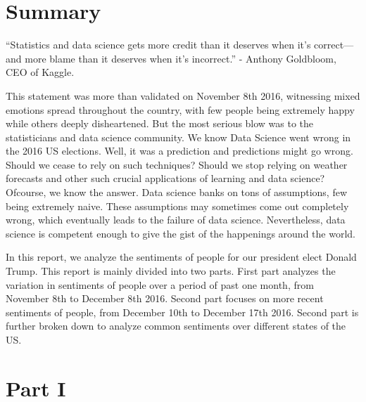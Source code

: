\documentclass[a4paper,12pt]{book}
\makeatletter
\def\cleardoublepage{\clearpage\if@twoside \ifodd\c@page\else%
  \hbox{}%
  \thispagestyle{empty}%
  \newpage%
  \if@twocolumn\hbox{}\newpage\fi\fi\fi}
\theoremstyle{break}
\makeatother
\begin{document}

\frontmatter

\chapter*{Summary}
“Statistics and data science gets more credit than it deserves when it’s correct—and more blame than it deserves when it’s incorrect.” - Anthony Goldbloom, CEO of Kaggle.

This statement was more than validated on November 8th 2016, witnessing mixed emotions spread throughout the country, with few people being extremely happy while others deeply disheartened. But the most serious blow was to the statisticians and data science community. We know Data Science went wrong in the 2016 US elections. Well, it was a prediction and predictions might go wrong. Should we cease to rely on such techniques? Should we stop relying on weather forecasts and other such crucial applications of learning and data science? Ofcourse, we know the answer. Data science banks on tons of assumptions, few being extremely naive. These assumptions may sometimes come out completely wrong, which eventually leads to the failure of data science. Nevertheless, data science is competent enough to give the gist of the happenings around the world.

In this report, we analyze the sentiments of people for our president elect Donald Trump. This report is mainly divided into two parts. First part analyzes the variation in sentiments of people over a period of past one month, from November 8th to December 8th 2016. Second part focuses on more recent sentiments of people, from December 10th to December 17th 2016. Second part is further broken down to analyze common sentiments over different states of the US.

\clearpage
\tableofcontents

\clearpage
\listoffigures

\clearpage


\mainmatter
\pagestyle{fancy}

\cleardoublepage





\chapter{Part I}
\end{document}
